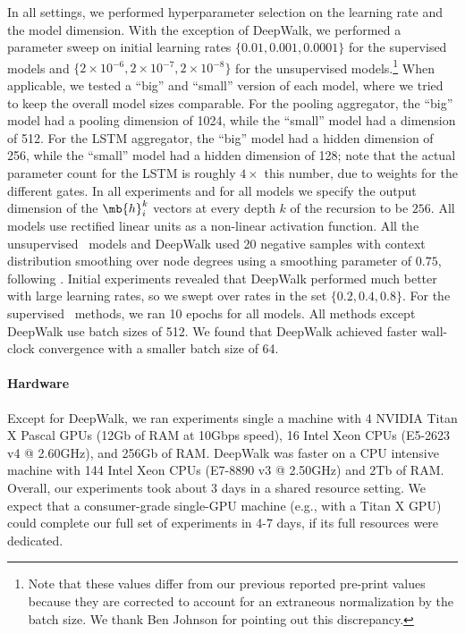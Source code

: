 In all settings, we performed hyperparameter selection on the learning rate and the model dimension.
With the exception of DeepWalk, we performed a parameter sweep on initial learning rates $\{0.01, 0.001, 0.0001\}$ for the supervised models and $\{2\times10^{-6}, 2\times10^{-7}, 2\times10^{-8}\}$ for the unsupervised models.\footnote{Note that these values differ from our previous reported pre-print values because they are corrected to account for an extraneous normalization by the batch size. We thank Ben Johnson for pointing out this discrepancy.}
When applicable, we tested a ``big'' and ``small'' version of each model, where we tried to keep the overall model sizes comparable.
For the pooling aggregator, the ``big'' model had a pooling dimension of 1024, while the ``small'' model had a dimension of  512.
For the LSTM aggregator, the ``big'' model had a hidden dimension of 256, while the ``small'' model had a hidden dimension of 128; note that the actual parameter count for the LSTM is roughly $4{\times}$ this number, due to weights for the different gates. 
In all experiments and for all models we specify the output dimension of the $\mb{h}^k_i$ vectors at every depth $k$ of the recursion to be $256$. 
All models use rectified linear units as a non-linear activation function.
All the unsupervised \name\ models and DeepWalk used 20 negative samples with context distribution smoothing over node degrees using a smoothing parameter of $0.75$, following \cite{grover2016node2vec,mikolov2013distributed,perozzi2014deepwalk}.
Initial experiments revealed that DeepWalk performed much better with large learning rates, so we swept over rates in the set $\{0.2,0.4,0.8\}$. 
For the supervised \name\ methods, we ran 10 epochs for all models. 
All methods except DeepWalk use batch sizes of 512.
We found that DeepWalk achieved faster wall-clock convergence with a smaller batch size of 64. 

\paragraph{Hardware}
Except for DeepWalk, we ran experiments single a machine with 4 NVIDIA Titan X Pascal GPUs (12Gb of RAM at 10Gbps speed), 16 Intel Xeon CPUs (E5-2623 v4 @ 2.60GHz), and 256Gb of RAM.  
DeepWalk was faster on a CPU intensive machine with 144 Intel Xeon CPUs (E7-8890 v3 @ 2.50GHz) and 2Tb of RAM. 
Overall, our experiments took about 3 days in a shared resource setting. 
We expect that a consumer-grade single-GPU machine (e.g., with a Titan X GPU) could complete our full set of experiments in 4-7 days, if its full resources were dedicated. 

